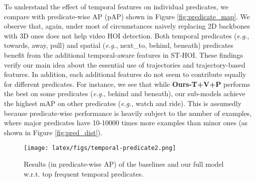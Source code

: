 \documentclass[sigconf]{acmart}
\begin{document}
To understand the effect of temporal features on individual predicates, we compare with predicate-wise AP (pAP) shown in Figure \ref{fig:predicate_map}.
We observe that, again, under most of circumstances naively replacing 2D backbones with 3D ones does not help video HOI detection.
Both temporal predicates (\emph{e.g.}, {\selectfont towards}, {\selectfont away}, {\selectfont pull}) and spatial (\emph{e.g.}, {\selectfont next\_to}, {\selectfont behind}, {\selectfont beneath}) predicates benefit from the additional temporal-aware features in ST-HOI.
These findings verify our main idea about the essential use of trajectories and trajectory-based features.
In addition, each additional features do not seem to contribute equally for different predicates.
For instance, we see that while \textbf{Ours-T+V+P} performs the best on some predicates (\emph{e.g.}, {\selectfont behind} and {\selectfont beneath}), our sub-models achieve the highest mAP on other predicates (\emph{e.g.}, {\selectfont watch} and {\selectfont ride}).
This is assumedly because predicate-wise performance is heavily subject to the number of examples, where major predicates have 10-10000 times more examples than minor ones (as shown in Figure \ref{fig:pred_dist}).

\begin{figure}[t!]
\begin{center}
\texttt{[image: latex/figs/temporal-predicate2.png]}
\end{center}
\vspace{-1.3em}
\caption{Results (in predicate-wise AP) of the baselines and our full model w.r.t. top frequent temporal predicates.}
\label{fig:temp_pred_result}
\vspace{-1.5em}
\end{figure}
\end{document}
